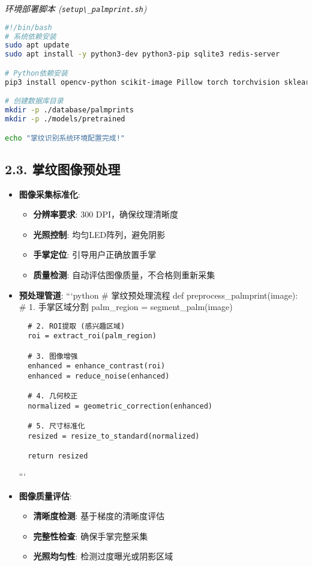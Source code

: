 \emph{环境部署脚本 (\passthrough{\lstinline!setup\_palmprint.sh!})}

\begin{lstlisting}[language=bash]
#!/bin/bash
# 系统依赖安装
sudo apt update
sudo apt install -y python3-dev python3-pip sqlite3 redis-server

# Python依赖安装
pip3 install opencv-python scikit-image Pillow torch torchvision sklearn redis pygame

# 创建数据库目录
mkdir -p ./database/palmprints
mkdir -p ./models/pretrained

echo "掌纹识别系统环境配置完成!"
\end{lstlisting}

\subsection{2.3.
掌纹图像预处理}\label{ux638cux7eb9ux56feux50cfux9884ux5904ux7406}

\begin{itemize}
\item
  \textbf{图像采集标准化}:

  \begin{itemize}
  \tightlist
  \item
    \textbf{分辨率要求}: 300 DPI，确保纹理清晰度
  \item
    \textbf{光照控制}: 均匀LED阵列，避免阴影
  \item
    \textbf{手掌定位}: 引导用户正确放置手掌
  \item
    \textbf{质量检测}: 自动评估图像质量，不合格则重新采集
  \end{itemize}
\item
  \textbf{预处理管道}: ```python \# 掌纹预处理流程 def
  preprocess\_palmprint(image): \# 1. 手掌区域分割 palm\_region =
  segment\_palm(image)

\begin{lstlisting}
  # 2. ROI提取 (感兴趣区域)
  roi = extract_roi(palm_region)

  # 3. 图像增强
  enhanced = enhance_contrast(roi)
  enhanced = reduce_noise(enhanced)

  # 4. 几何校正
  normalized = geometric_correction(enhanced)

  # 5. 尺寸标准化
  resized = resize_to_standard(normalized)

  return resized
\end{lstlisting}

  ```
\item
  \textbf{图像质量评估}:

  \begin{itemize}
  \tightlist
  \item
    \textbf{清晰度检测}: 基于梯度的清晰度评估
  \item
    \textbf{完整性检查}: 确保手掌完整采集
  \item
    \textbf{光照均匀性}: 检测过度曝光或阴影区域
  \end{itemize}
\end{itemize}

